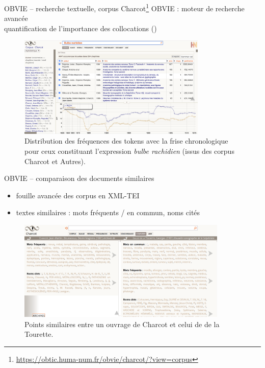 \begin{frame}{OBVIE -- recherche textuelle, corpus Charcot\footnote{\url{https://obtic.huma-num.fr/obvie/charcot/?view=corpus}}}
\textsc{OBVIE} : moteur de recherche avancée {\small\citep{alrahabi2022obvie}}\\
{\small \danger quantification de l'importance des \og{}collocations\fg{} (\cite{nerima2006})}
\begin{figure}[!h]
    \centering
\includegraphics[width=90mm,scale=0.5]{pic/bulbe_rachidien_mini.png}
    \caption{Distribution des fréquences des tokens avec la frise chronologique pour ceux constituant l'expression \textit{bulbe rachidien} (issus des corpus \textrm{Charcot} et \textrm{Autres}).}
    \label{fig:my_label}
\end{figure}
\end{frame}

\begin{frame}{OBVIE -- comparaison des documents similaires}
\begin{itemize}
\item fouille avancée des corpus en \textsc{XML-TEI}
\item textes similaires : mots fréquents / en commun, noms cités
\end{itemize}
\begin{figure}[!h]
    \centering
\includegraphics[width=100mm,scale=0.5]{pic/doc_sim.png}
    \caption{Points similaires entre un ouvrage de Charcot et celui de de la Tourette.}
    \label{fig:my_label}
\end{figure}
\end{frame}

